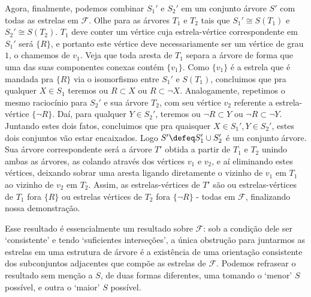 \begin{prova}
    Agora, finalmente, podemos combinar $S_1'$ e $S_2'$ em um conjunto árvore $S'$ com todas as estrelas em $\mathcal{F}$. Olhe para as árvores $T_1$ e $T_2$ tais que $S_1' \cong S(T_1)$ e $S_2' \cong S(T_2)$. $T_1$ deve conter um vértice cuja estrela-vértice correspondente em $S_1'$ será $\{R\}$, e portanto este vértice deve necessariamente ser um vértice de grau $1$, o chamemos de $v_1$. Veja que toda aresta de $T_1$ separa a árvore de forma que uma das suas componentes conexas contém $\{v_1\}$. Como $\{v_1\}$ é a estrela que é mandada pra $\{R\}$ via o isomorfismo entre $S_1'$ e $S(T_1)$, concluimos que pra qualquer $X \in S_1$ teremos ou $R \subset X$ ou $R \subset \lnot X$. Analogamente, repetimos o mesmo raciocínio para $S_2'$ e sua árvore $T_2$, com seu vértice $v_2$ referente a estrela-vértice $\{\lnot R\}$. Daí, para qualquer $Y \in S_2'$, teremos ou $\lnot R \subset Y$ ou $\lnot R \subset \lnot Y$. Juntando estes dois fatos, concluimos que pra quaisquer $X \in S_1', Y \in S_2'$, estes dois conjuntos vão estar encaixados. Logo $S' \defeq S_1' \cup S_2'$ é um conjunto árvore. Sua árvore correspondente será a árvore $T'$ obtida a partir de $T_1$ e $T_2$ unindo ambas as árvores, as colando através dos vértices $v_1$ e $v_2$, e aí eliminando estes vértices, deixando sobrar uma aresta ligando diretamente o vizinho de $v_1$ em $T_1$ ao vizinho de $v_2$ em $T_2$. Assim, as estrelas-vértices de $T'$ são ou estrelas-vértices de $T_1$ fora $\{R\}$ ou estrelas vértices de $T_2$ fora $\{\lnot R\}$ - todas em $\mathcal{F}$, finalizando nossa demonstração.  

  \end{prova}

  Esse resultado é essencialmente um resultado sobre $\mathcal{F}$: sob a condição dele ser `consistente' e tendo `suficientes interseções', a única obstrução para juntarmos as estrelas em uma estrutura de árvore é a existência de uma orientação consistente dos subconjuntos adjacentes que compõe as estrelas de $\mathcal{F}$. Podemos refrasear o resultado sem menção a $S$, de duas formas diferentes, uma tomando o `menor' $S$ possível, e outra o `maior' $S$ possível.

